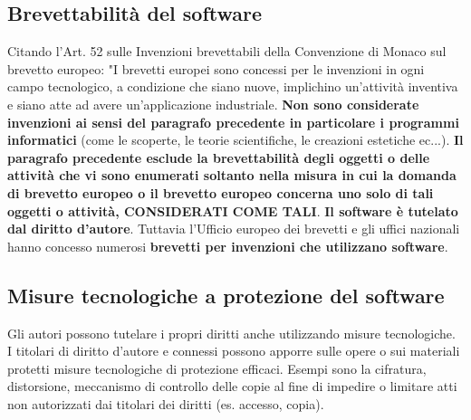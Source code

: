 \subsection{Brevettabilità del software}
Citando l'Art. 52 sulle Invenzioni brevettabili della Convenzione di Monaco sul brevetto europeo:\newline
"I brevetti europei sono concessi per le invenzioni in ogni campo tecnologico, a condizione che siano nuove,
implichino un'attività inventiva e siano atte ad avere un'applicazione industriale.\newline
\textbf{Non sono considerate invenzioni ai sensi del paragrafo precedente in particolare i programmi informatici}
(come le scoperte, le teorie scientifiche, le creazioni estetiche ec...). \newline
\textbf{Il paragrafo precedente esclude la brevettabilità degli oggetti o delle attività che vi sono enumerati
soltanto nella misura in cui la domanda di brevetto europeo o il brevetto europeo concerna uno solo di tali oggetti
o attività, CONSIDERATI COME TALI}.\newline
\newline
\textbf{Il software è tutelato dal diritto d'autore}. Tuttavia l'Ufficio europeo dei brevetti e gli uffici nazionali
hanno concesso numerosi \textbf{brevetti per invenzioni che utilizzano software}.

\subsection{Misure tecnologiche a protezione del software}
Gli autori possono tutelare i propri diritti anche utilizzando misure tecnologiche. \newline
I titolari di diritto d'autore e connessi possono apporre sulle opere o sui materiali
protetti misure tecnologiche di protezione efficaci. Esempi sono la cifratura, distorsione,
meccanismo di controllo delle copie al fine di impedire o limitare atti non autorizzati dai titolari
dei diritti (es. accesso, copia).

